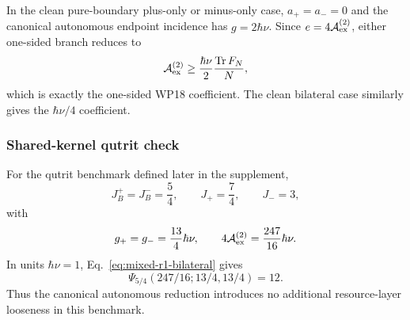 In the clean pure-boundary plus-only or minus-only case, $a_+=a_-=0$ and the canonical autonomous endpoint incidence has $g=2\hbar\nu$. Since $e=4\mathcal A_{\rm ex}^{(2)}$, either one-sided branch reduces to
\begin{equation}
\mathcal A_{\rm ex}^{(2)}
\ge\frac{\hbar\nu}{2}\frac{\operatorname{Tr} F_N}{N},
\end{equation}
which is exactly the one-sided WP18 coefficient. The clean bilateral case similarly gives the $\hbar\nu/4$ coefficient.

\subsubsection{Shared-kernel qutrit check}

For the qutrit benchmark defined later in the supplement,
\begin{equation}
J_B^+=J_B^-=\frac54,
\qquad
J_+=\frac74,
\qquad
J_-=3,
\end{equation}
with
\begin{equation}
g_+=g_-=\frac{13}{4}\hbar\nu,
\qquad
4\mathcal A_{\rm ex}^{(2)}=\frac{247}{16}\hbar\nu.
\end{equation}
In units $\hbar\nu=1$, Eq.~\eqref{eq:mixed-r1-bilateral} gives
\begin{equation}
\Psi_{5/4}(247/16;13/4,13/4)=12.
\end{equation}
Thus the canonical autonomous reduction introduces no additional resource-layer looseness in this benchmark.
